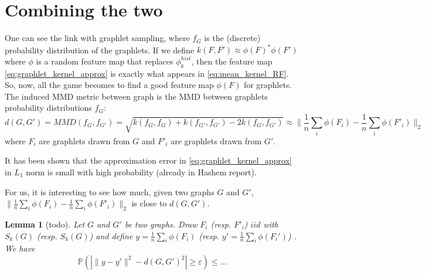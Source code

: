\documentclass{article}
\newtheorem{lemma}{Lemma}
\begin{document}
\section{Combining the two}

One can see the link with graphlet sampling, where $f_G$ is the (discrete) probability distribution of the graphlets. If we define $k(F, F') \approx \phi(F)^*\phi(F')$ where $\phi$ is a random feature map that replaces $\phi_k^{hist}$, then the feature map \eqref{eq:graphlet_kernel_approx} is exactly what appears in \eqref{eq:mean_kernel_RF}. So, now, all the game becomes to find a good feature map $\phi(F)$ for graphlets. The induced MMD metric between graph is the MMD between graphlets probability distributions $f_G$:
\[
d(G,G') = MMD(f_G, f_{G'}) = \sqrt{k(f_G, f_{G}) + k(f_{G'}, f_{G'}) - 2 k(f_G, f_{G'})} \approx \| \frac{1}{n} \sum_i \phi(F_i) - \frac{1}{n} \sum_i \phi(F'_i)\|_2
\]
where $F_i$ are graphlets drawn from $G$ and $F'_i$ are graphlets drawn from $G'$.

It has been shown that the approximation error in \eqref{eq:graphlet_kernel_approx} in $L_1$ norm is small with high probability (already in Hashem report).

For us, it is interesting to see how much, given two graphs $G$ and $G'$, $\|\frac{1}{n} \sum_i \phi(F_i) - \frac{1}{n} \sum_i \phi(F'_i)\|_2$ is close to $d(G,G')$.
\begin{lemma}[todo]
Let $G$ and $G'$ be two graphs. Draw $F_i$ (resp. $F'_i$) $iid$ with $S_k(G)$ (resp. $S_k(G)$) and define $y =\frac{1}{n} \sum_i \phi(F_i)$ (resp. $y' = \frac{1}{n} \sum_i \phi(F_i')$) . We have
\[
\mathbb{P}(|\|y-y'\|^2 - d(G,G')^2| \geq \varepsilon) \leq ...
\]
\end{lemma}
\end{document}
